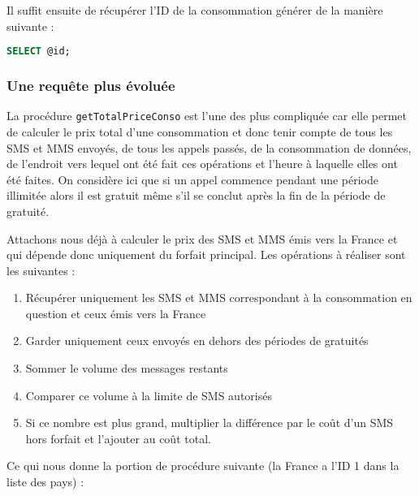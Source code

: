 Il suffit ensuite de récupérer l'ID de la consommation générer de la manière suivante :

\begin{lstlisting}[language=sql]
SELECT @id;
\end{lstlisting}

\subsubsection{Une requête plus évoluée}
La procédure \texttt{getTotalPriceConso} est l'une des plus compliquée car elle permet de calculer le prix total d'une consommation et donc tenir compte de tous les SMS et MMS envoyés, de tous les appels passés, de la consommation de données, de l'endroit vers lequel ont été fait ces opérations et l'heure à laquelle elles ont été faites.
On considère ici que si un appel commence pendant une période illimitée alors il est gratuit même s'il se conclut après la fin de la période de gratuité.

Attachons nous déjà à calculer le prix des SMS et MMS émis vers la France et qui dépende donc uniquement du forfait principal. Les opérations à réaliser sont les suivantes :
\begin{enumerate}
	\item Récupérer uniquement les SMS et MMS correspondant à la consommation en question et ceux émis vers la France
	\item Garder uniquement ceux envoyés en dehors des périodes de gratuités
	\item Sommer le volume des messages restants
	\item Comparer ce volume à la limite de SMS autorisés
	\item Si ce nombre est plus grand, multiplier la différence par le coût d'un SMS hors forfait et l'ajouter au coût total.
\end{enumerate}

Ce qui nous donne la portion de procédure suivante (la France a l'ID 1 dans la liste des pays) :

